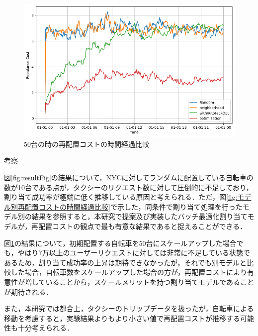 \documentclass[a4j, 10pt, twocolumn]{ltjarticle}  %
\makeatletter
\renewcommand{\section}{\@startsection{section}{1}{\z@}
   {1.5\Cvs \@plus.5\Cvs \@minus.2\Cvs}
   {.5\Cvs \@plus.3\Cvs}
   {\reset@font\large\bfseries}}  %
\makeatother
\begin{document}
        \begin{figure}[b!]
          \centering
          \includegraphics[scale=0.36]
          {figures/CompareRebalanceCost-50.png}
          \caption{50台の時の再配置コストの時間経過比較}
          \label{fig:50台の時の再配置コストの時間経過比較}
        \end{figure}

    \vspace{-5mm}

    \section{考察}
        \label{sec:考察}
        \vspace{-3mm}
        \par 図\ref{fig:resultFig}の結果について，NYCに対してランダムに配置している自転車の数が10台である点が，タクシーのリクエスト数に対して圧倒的に不足しており，割り当て成功率が極端に低く推移している原因と考えられる．ただ，図\ref{fig:モデル別再配置コストの時間経過比較}で示した，同条件で割り当て処理を行ったモデル別の結果を参照すると，本研究で提案及び実装したバッチ最適化割り当てモデルが，再配置コストの観点で最も有意な結果であると捉えることができる．
        \par 図\ref{fig:50台の時の再配置コストの時間経過比較}の結果について，初期配置する自転車を50台にスケールアップした場合でも，やはり7万以上のユーザーリクエストに対しては非常に不足している状態であるため，割り当て成功率の上昇は期待できなかったが，それでも別モデルと比較した場合，自転車数をスケールアップした場合の方が，再配置コストにより有意性が増していることから，スケールメリットを持つ割り当てモデルであることが期待される．
        \par また，本研究では都合上，タクシーのトリップデータを扱ったが，自転車による移動を考慮すると，実験結果よりもより小さい値で再配置コストが推移する可能性も十分考えられる．
\end{document}
